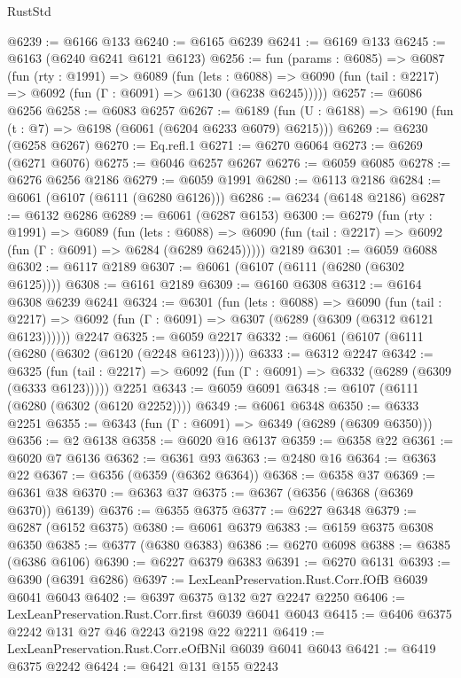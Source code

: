 \begin{lexlean}{RustStd}
\begin{coremodule}
@6239 := @6166 @133
@6240 := @6165 @6239
@6241 := @6169 @133
@6245 := @6163 (@6240 @6241 @6121 @6123)
@6256 := fun (params : @6085) =>
  @6087
    (fun (rty : @1991) =>
    @6089
      (fun (lets : @6088) =>
      @6090 (fun (tail : @2217) => @6092 (fun (Γ : @6091) => @6130 (@6238 @6245)))))
@6257 := @6086 @6256
@6258 := @6083 @6257
@6267 := @6189 (fun (U : @6188) => @6190 (fun (t : @7) => @6198 (@6061 (@6204 @6233 @6079) @6215)))
@6269 := @6230 (@6258 @6267)
@6270 := Eq.refl.{1}
@6271 := @6270 @6064
@6273 := @6269 (@6271 @6076)
@6275 := @6046 @6257 @6267
@6276 := @6059 @6085
@6278 := @6276 @6256 @2186
@6279 := @6059 @1991
@6280 := @6113 @2186
@6284 := @6061 (@6107 (@6111 (@6280 @6126)))
@6286 := @6234 (@6148 @2186)
@6287 := @6132 @6286
@6289 := @6061 (@6287 @6153)
@6300 := @6279
    (fun (rty : @1991) =>
    @6089
      (fun (lets : @6088) =>
      @6090 (fun (tail : @2217) => @6092 (fun (Γ : @6091) => @6284 (@6289 @6245)))))
    @2189
@6301 := @6059 @6088
@6302 := @6117 @2189
@6307 := @6061 (@6107 (@6111 (@6280 (@6302 @6125))))
@6308 := @6161 @2189
@6309 := @6160 @6308
@6312 := @6164 @6308 @6239 @6241
@6324 := @6301
    (fun (lets : @6088) =>
    @6090
      (fun (tail : @2217) => @6092 (fun (Γ : @6091) => @6307 (@6289 (@6309 (@6312 @6121 @6123))))))
    @2247
@6325 := @6059 @2217
@6332 := @6061 (@6107 (@6111 (@6280 (@6302 (@6120 (@2248 @6123))))))
@6333 := @6312 @2247
@6342 := @6325
    (fun (tail : @2217) => @6092 (fun (Γ : @6091) => @6332 (@6289 (@6309 (@6333 @6123)))))
    @2251
@6343 := @6059 @6091
@6348 := @6107 (@6111 (@6280 (@6302 (@6120 @2252))))
@6349 := @6061 @6348
@6350 := @6333 @2251
@6355 := @6343 (fun (Γ : @6091) => @6349 (@6289 (@6309 @6350)))
@6356 := @2 @6138
@6358 := @6020 @16 @6137
@6359 := @6358 @22
@6361 := @6020 @7 @6136
@6362 := @6361 @93
@6363 := @2480 @16
@6364 := @6363 @22
@6367 := @6356 (@6359 (@6362 @6364))
@6368 := @6358 @37
@6369 := @6361 @38
@6370 := @6363 @37
@6375 := @6367 (@6356 (@6368 (@6369 @6370)) @6139)
@6376 := @6355 @6375
@6377 := @6227 @6348
@6379 := @6287 (@6152 @6375)
@6380 := @6061 @6379
@6383 := @6159 @6375 @6308 @6350
@6385 := @6377 (@6380 @6383)
@6386 := @6270 @6098
@6388 := @6385 (@6386 @6106)
@6390 := @6227 @6379 @6383
@6391 := @6270 @6131
@6393 := @6390 (@6391 @6286)
@6397 := LexLeanPreservation.Rust.Corr.fOfB @6039 @6041 @6043
@6402 := @6397 @6375 @132 @27 @2247 @2250
@6406 := LexLeanPreservation.Rust.Corr.first @6039 @6041 @6043
@6415 := @6406 @6375 @2242 @131 @27 @46 @2243 @2198 @22 @2211
@6419 := LexLeanPreservation.Rust.Corr.eOfBNil @6039 @6041 @6043
@6421 := @6419 @6375 @2242
@6424 := @6421 @131 @155 @2243

\end{coremodule}
\end{lexlean}
